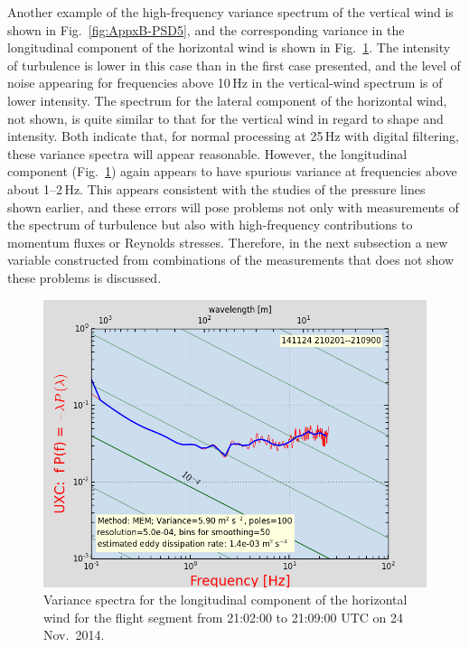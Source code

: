 \documentclass[12pt,twoside,english]{article}\usepackage[]{graphicx}\usepackage[]{color}
\let\OrgIndex\index
\renewcommand*{\index}[1]{\OrgIndex{#1}}
\begin{document}
Another example of the high-frequency variance spectrum of the vertical wind is shown in Fig.~\ref{fig:AppxB-PSD5}, and the corresponding variance in the longitudinal component of the horizontal wind is shown in Fig.~\ref{fig:AppxB-PSD6}. The intensity of turbulence is lower in this case than in the first case presented, and the level of noise appearing for frequencies above 10\,Hz in the vertical-wind spectrum is of lower intensity. The spectrum for the lateral component of the horizontal wind, not shown, is quite similar to that for the vertical wind in regard to shape and intensity. Both indicate that, for normal processing at 25\,Hz with digital filtering, these variance spectra will appear reasonable. However, the longitudinal component (Fig.~\ref{fig:AppxB-PSD6}) again appears to have spurious variance at frequencies above about 1--2\,Hz. This appears consistent with the studies of the pressure lines shown earlier, and these errors will pose problems not only with measurements of the spectrum of turbulence but also with high-frequency contributions to momentum fluxes or Reynolds stresses. Therefore, in the next subsection a new variable constructed from combinations of the measurements that does not show these problems is discussed. 

\begin{figure}
\noindent \begin{centering}
\includegraphics[height=0.4\textheight]{SpecialGraphics/PSD6.png}  
\par\end{centering}

\protect\protect\protect\caption{\label{fig:AppxB-PSD6}Variance spectra for the longitudinal component of the horizontal wind for the flight segment from 21:02:00 to 21:09:00 UTC on 24 Nov.\ 2014.} 
\end{figure}
\end{document}
